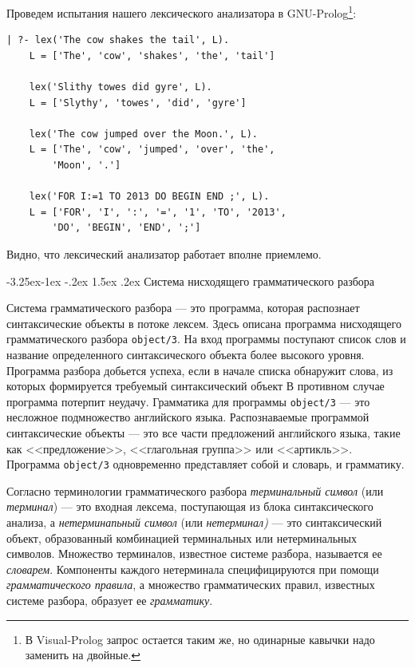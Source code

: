 \documentclass[12pt, openany, twoside]{book} %
\makeatletter
\renewcommand\subsection{\@startsection{subsection}{2}{\z@}%
                                     {-3.25ex\@plus -1ex \@minus -.2ex}%
                                     {1.5ex \@plus .2ex}%
                                     {\normalfont\normalsize\bfseries}}
\makeatother
\begin{document}
Проведем испытания нашего лексического анализатора в GNU-Prolog\footnote{В Visual-Prolog запрос остается таким же, но одинарные кавычки надо заменить на двойные.}:
{\tt\begin{verbatim}
| ?- lex('The cow shakes the tail', L).
    L = ['The', 'cow', 'shakes', 'the', 'tail']

    lex('Slithy towes did gyre', L).
    L = ['Slythy', 'towes', 'did', 'gyre']

    lex('The cow jumped over the Moon.', L).
    L = ['The', 'cow', 'jumped', 'over', 'the',
        'Moon', '.']

    lex('FOR I:=1 TO 2013 DO BEGIN END ;', L).
    L = ['FOR', 'I', ':', '=', '1', 'TO', '2013',
        'DO', 'BEGIN', 'END', ';']
\end{verbatim}}
\noindent Видно, что лексический анализатор работает вполне приемлемо.

\subsection{Система нисходящего грамматического разбора}

Система грамматического разбора --- это программа, которая распознает синтаксические объекты в потоке лексем. Здесь описана программа нисходящего грамматического разбора {\tt object/3}. На вход программы поступают список слов и название определенного синтаксического объекта более высокого уровня. Программа разбора добьется успеха, если в начале списка обнаружит слова, из которых формируется требуемый синтаксический объект В противном случае программа потерпит неудачу. Грамматика для программы {\tt object/3} --- это несложное подмножество английского языка. Распознаваемые программой синтаксические объекты --- это все части предложений английского языка, такие как <<предложение>>, <<глагольная группа>> или <<артикль>>. Программа {\tt object/3} одновременно представляет собой и словарь, и грамматику.

Согласно терминологии грамматического разбора \emph{терминальный символ} (или \emph{терминал}) --- это входная лексема, поступающая из блока синтаксического анализа, а \emph{нетерминапьный символ} (или \emph{нетерминал)} --- это синтаксический объект, образованный комбинацией терминальных или нетерминальных символов. Множество терминалов, известное системе разбора, называется ее \emph{словарем}. Компоненты каждого нетерминала специфицируются при помощи \emph{грамматического правила}, а множество грамматических правил, известных системе разбора, образует ее \emph{грамматику}.
\end{document}

